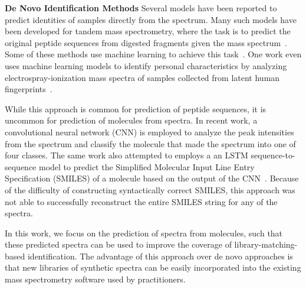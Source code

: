 \textbf{De Novo Identification Methods} Several models have been reported to predict identities of samples directly from the spectrum. Many such models have been developed for tandem mass spectrometry, where the task is to predict the original peptide sequences from digested fragments given the mass spectrum~\cite{Eng1994sequest}. Some of these methods use machine learning to achieve this task~\cite{Tran8247deepnovo, Schoenholtz2018supervision}. One work even uses machine learning models to identify personal characteristics by analyzing electrospray-ionization mass spectra of samples collected from latent human fingerprints~\cite{Zhou2017LatentFingerprints}.
    
While this approach is common for prediction of peptide sequences, it is uncommon for prediction of molecules from spectra. In recent work, a convolutional neural network (CNN) is employed to analyze the peak intensities from the spectrum and classify the molecule that made the spectrum into one of four classes\cite{spec2smiles}. The same work also attempted to employs a an LSTM sequence-to-sequence model to predict the Simplified Molecular Input Line Entry Specification (SMILES) of a molecule based on the output of the CNN~\cite{spec2smiles}. Because of the difficulty of constructing syntactically correct SMILES, this approach was not able to successfully reconstruct the entire SMILES string for any of the spectra.
    
In this work, we focus on the prediction of spectra from molecules, such that these predicted spectra can be used to improve the coverage of library-matching-based identification. The advantage of this approach over de novo approaches is that new libraries of synthetic spectra can be easily incorporated into the existing mass spectrometry software used by practitioners.
  

